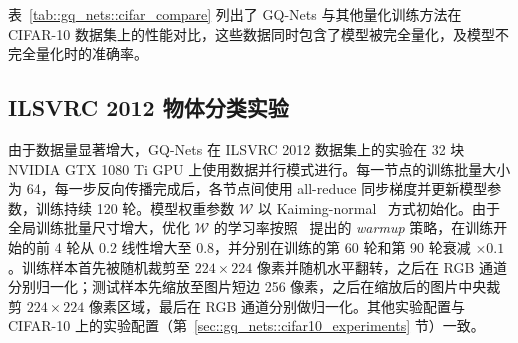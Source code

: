 表~\ref{tab::gq_nets::cifar_compare} 列出了 GQ-Nets 与其他量化训练方法在 CIFAR-10 数据集上的性能对比，这些数据同时包含了模型被完全量化，及模型不完全量化时的准确率。
\subsection{ILSVRC 2012 物体分类实验}
由于数据量显著增大，GQ-Nets 在 ILSVRC 2012 数据集上的实验在 32 块 NVIDIA GTX 1080 Ti GPU 上使用数据并行模式进行。每一节点的训练批量大小为 64，每一步反向传播完成后，各节点间使用 all-reduce 同步梯度并更新模型参数，训练持续 120 轮。模型权重参数 $\mathcal{W}$ 以 Kaiming-normal~\citep{He_2015} 方式初始化。由于全局训练批量尺寸增大，优化 $\mathcal{W}$ 的学习率按照~\citet{goyal2017accurate} 提出的 \emph{warmup} 策略，在训练开始的前 4 轮从 0.2 线性增大至 0.8，并分别在训练的第 60 轮和第 90 轮衰减 $\times 0.1$。训练样本首先被随机裁剪至 $224\times 224$ 像素并随机水平翻转，之后在 RGB 通道分别归一化；测试样本先缩放至图片短边 256 像素，之后在缩放后的图片中央裁剪 $224\times 224$ 像素区域，最后在 RGB 通道分别做归一化。其他实验配置与 CIFAR-10 上的实验配置（第~\ref{sec::gq_nets::cifar10_experiments} 节）一致。

